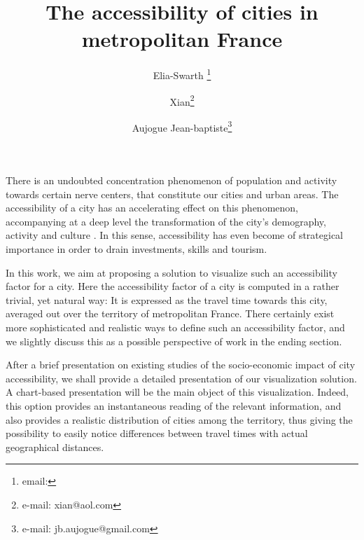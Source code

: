 \documentclass{vgtc}                          %
\title{The accessibility of cities in metropolitan France}
\author{Elia-Swarth \thanks{email:}\\ %
\and Xian\thanks{e-mail: xian@aol.com}\\ %
\and Aujogue Jean-baptiste\thanks{e-mail: jb.aujogue@gmail.com}} %
\begin{document}


\vspace{0.2cm}

\maketitle
There is an undoubted concentration phenomenon of population and activity towards certain nerve centers, that constitute our cities and urban areas. The accessibility of a city has an accelerating effect on this phenomenon, accompanying at a deep level the transformation of the city's demography, activity and culture \cite{RePEc:mtp:titles:0262561476}. In this sense, accessibility has even become of strategical importance in order to drain investments, skills and tourism.


 In this work, we aim at proposing a solution to visualize such an accessibility factor for a city. Here the accessibility factor of a city is computed in a rather trivial, yet natural way: It is expressed as the travel time towards this city, averaged out over the territory of metropolitan France. There certainly exist more sophisticated and realistic ways to define such an accessibility factor, and we slightly discuss this as a possible perspective of work in the ending section.


After a brief presentation on existing studies of the socio-economic impact of city accessibility, we shall provide a detailed presentation of our visualization solution. A chart-based presentation will be the main object of this visualization. Indeed, this option provides an instantaneous reading of the relevant information, and also provides a realistic distribution of cities among the territory, thus giving the possibility to easily notice differences between travel times with actual geographical distances.

\end{document}
